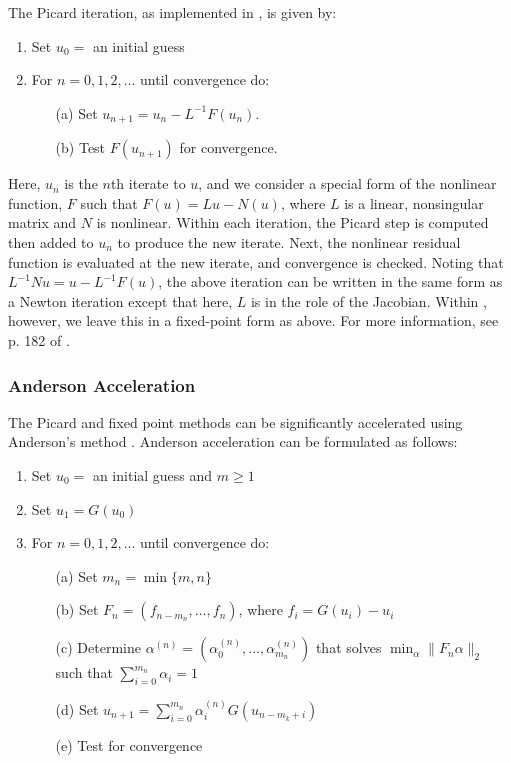 
The Picard iteration, as implemented in {\kinsol}, is given by:

\vspace{1ex}
\begin{enumerate}
   \item Set $u_0 = $ an initial guess
   \item For $n = 0, 1, 2,...$ until convergence do:
      \begin{itemize}
          \item[(a)] Set $u_{n+1} = u_n - L^{-1}F(u_n)$.
          \item[(b)] Test $F(u_{n+1})$ for convergence.
      \end{itemize}
\end{enumerate}
Here, $u_n$ is the $n$th iterate to $u$, and we consider a special form of the 
nonlinear function, $F$ such that
$F(u) = Lu - N(u)$, where $L$ is a linear, nonsingular matrix and $N$ is nonlinear.
Within each iteration, the Picard step is computed then added to $u_n$ to produce 
the new iterate.  Next, the nonlinear residual
function is evaluated at the new iterate, and convergence is checked.
Noting that $L^{-1}Nu = u - L^{-1}F(u)$, the above iteration can be written in the same form
as a Newton iteration except that here, $L$ is in the role of the Jacobian.
Within {\kinsol}, however, we leave this in a fixed-point form as above. 
For more information, see p. 182 of \cite{Ortega-Rheinbolt00}.



\subsubsection*{Anderson Acceleration}
The Picard and fixed point methods can be significantly accelerated using 
Anderson's method \cite{Anderson65, Walker-Ni09, Fang-Saad09, LWWY11}.
Anderson acceleration can be formulated as follows:

\vspace{1ex}
\begin{enumerate}
   \item Set $u_0 = $ an initial guess and $m \ge 1$
   \item Set $u_1 = G(u_0)$ 
   \item For $n = 0, 1, 2,...$ until convergence do:
      \begin{itemize}
          \item[(a)] Set $m_n = \min\{m,n\}$
          \item[(b)] Set $F_{n} = (f_{n-m_n}, \ldots, f_n)$, where $f_i=G(u_i)-u_i$
          \item[(c)] Determine $\alpha^{(n)} = (\alpha_0^{(n)}, \ldots, \alpha_{m_n}^{(n)})$ that solves 
	$\min_\alpha  \| F_n \alpha \|_2$ such that $\sum_{i=0}^{m_n} \alpha_i = 1$
          \item[(d)] Set $u_{n+1} = \sum_{i=0}^{m_n} \alpha_i^{(n)} G(u_{n-m_k+i})$
          \item[(e)] Test for convergence
      \end{itemize}
\end{enumerate}


